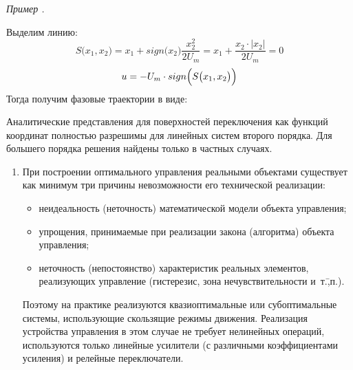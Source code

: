 \documentclass[preprint,russian,a5paper,10pt,twoside,mediummath]{ncc}
\newcounter{problem}[section]				%
\renewcommand{\theproblem}{\thesection.\arabic{problem}}		%
\newenvironment{problem}%
	{\par \vspace{\baselineskip} \refstepcounter{problem} {\raggedleft \textit{Пример \theproblem} \par} \vspace{-0.5\baselineskip} \begin{oframed}}%
	{\par \end{oframed}}%
\begin{document}
\begin{problem}
Выделим линию:
\[ S \bigl( x_1, x_2 \bigr) = x_1 + sign \bigl( x_2 \bigr) \frac{x_2^2}{2U_m} = x_1 + \frac{x_2 \cdot \bigl| x_2 \bigr| }{2U_m} = 0 \]
\[ u = -U_m \cdot sign \Bigl( S \bigl( x_1, x_2 \bigr) \Bigr) \]
Тогда получим фазовые траектории в виде:
\begin{center}
\end{center}
\end{problem}
Аналитические представления для поверхностей переключения как функций координат полностью разрешимы для линейных систем второго порядка. Для большего порядка решения найдены только в частных случаях.

 \begin{enumerate}[resume]
 \item При построении оптимального управления реальными объектами существует как минимум три причины невозможности его технической реализации:
 \begin{itemize}
 \item неидеальность (неточность) математической модели объекта управления;
 \item упрощения, принимаемые при реализации закона (алгоритма) объекта управления;
 \item неточность (непостоянство) характеристик реальных элементов, реализующих управление (гистерезис, зона нечувствительности и~т.\=,п.).
  \end{itemize}

Поэтому на практике реализуются квазиоптимальные или субоптимальные системы, использующие скользящие режимы движения. Реализация устройства управления в этом случае не требует нелинейных операций, используются только линейные усилители (с различными коэффициентами усиления) и релейные переключатели.
 \end{enumerate}
 
\end{document}
